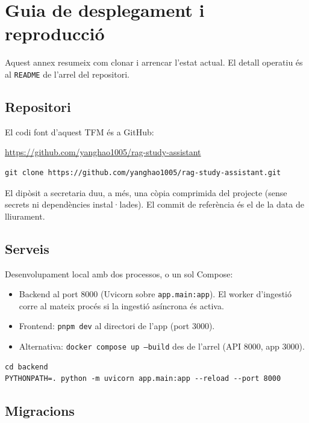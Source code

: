 \chapter{Guia de desplegament i reproducció}
\label{anexo:despliegue}

Aquest annex resumeix com clonar i arrencar l'estat actual. El detall operatiu és al \texttt{README} de l'arrel del repositori.

\section{Repositori}

El codi font d'aquest TFM és a GitHub:

\begin{center}
\url{https://github.com/yanghao1005/rag-study-assistant}
\end{center}

\begin{lstlisting}
git clone https://github.com/yanghao1005/rag-study-assistant.git
\end{lstlisting}

El dipòsit a secretaria duu, a més, una còpia comprimida del projecte (sense secrets ni dependències instal·lades). El commit de referència és el de la data de lliurament.

\section{Serveis}

Desenvolupament local amb dos processos, o un sol Compose:

\begin{itemize}
  \item Backend al port 8000 (Uvicorn sobre \texttt{app.main:app}). El worker d'ingestió corre al mateix procés si la ingestió asíncrona és activa.
  \item Frontend: \texttt{pnpm dev} al directori de l'app (port 3000).
  \item Alternativa: \texttt{docker compose up --build} des de l'arrel (API 8000, app 3000).
\end{itemize}

\begin{lstlisting}
cd backend
PYTHONPATH=. python -m uvicorn app.main:app --reload --port 8000
\end{lstlisting}

\section{Migracions}

